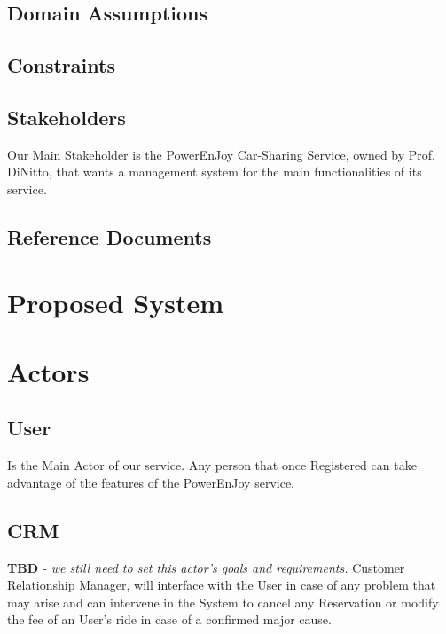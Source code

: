 \documentclass[a4paper]{article}
\begin{document}
\subsection{Domain Assumptions}
\subsection{Constraints}
\subsection{Stakeholders}
Our Main Stakeholder is the PowerEnJoy Car-Sharing Service, owned by Prof. DiNitto, that wants a management system for the main functionalities of its service.
\subsection{Reference Documents}

\section{Proposed System}
\newpage

\section{Actors}
\subsection{User}
Is the Main Actor of our service. Any person that once Registered can take advantage of the features of the PowerEnJoy service.
\subsection {CRM}
\textbf{TBD} \textit{- we still need to set this actor's goals and requirements.}
Customer Relationship Manager, will interface with the User in case of any problem that may arise and can intervene in the System to cancel any Reservation or modify the fee of an User's ride in case of a confirmed major cause.
\end{document}
